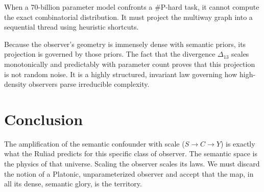 \documentclass[12pt,a4paper]{article}
\begin{document}
When a 70-billion parameter model confronts a \#P-hard task, it cannot compute the exact combinatorial distribution. It must project the multiway graph into a sequential thread using heuristic shortcuts.

Because the observer's geometry is immensely dense with semantic priors, its projection is governed by those priors. The fact that the divergence $\Delta_{13}$ scales monotonically and predictably with parameter count proves that this projection is not random noise. It is a highly structured, invariant law governing how high-density observers parse irreducible complexity.

\section{Conclusion}

The amplification of the semantic confounder with scale ($S \rightarrow C \rightarrow Y$) is exactly what the Ruliad predicts for this specific class of observer. The semantic space is the physics of that universe. Scaling the observer scales its laws. We must discard the notion of a Platonic, unparameterized observer and accept that the map, in all its dense, semantic glory, is the territory.
\end{document}
